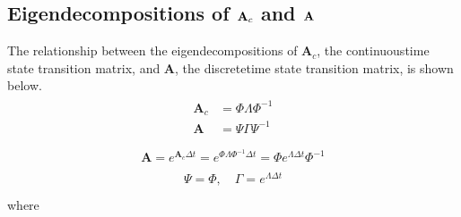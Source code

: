 \documentclass[letterpaper,10pt,english]{sphinxmanual}
\begin{document}
\subsection{Eigendecompositions of \protect\(\mathbf{A}_{c}\protect\) and \protect\(\mathbf{A}\protect\)}
\label{\detokenize{theory/modes:eigendecompositions-of-mathbf-a-c-and-mathbf-a}}
\sphinxAtStartPar
The relationship between the eigendecompositions of
\(\mathbf{A}_{c}\), the continuous\sphinxhyphen{}time state transition matrix, and
\(\mathbf{A}\), the discrete\sphinxhyphen{}time state transition matrix, is shown
below.
\begin{equation*}
\begin{split}\begin{aligned}
\mathbf{A}_{c} &= \Phi\Lambda\Phi^{-1} \\
\mathbf{A} &= \Psi\Gamma\Psi^{-1} \\
\end{aligned}\end{split}
\end{equation*}\begin{equation*}
\begin{split}\begin{aligned}
\mathbf{A} = e^{\mathbf{A}_{c}\Delta t} = e^{\Phi\Lambda\Phi^{-1}\Delta t} = \Phi e^{\Lambda\Delta t}\Phi^{-1}
\end{aligned}\end{split}
\end{equation*}\begin{equation*}
\begin{split}\begin{aligned}
\Psi = \Phi, \quad \Gamma = e^{\Lambda\Delta t} \\
\end{aligned}\end{split}
\end{equation*}
\sphinxAtStartPar
where
\end{document}
